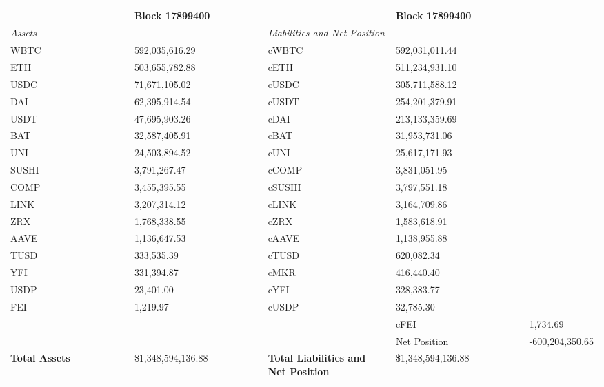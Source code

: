 
\begin{longtable}{@{}p{0.25\linewidth}p{0.25\linewidth}p{0.25\linewidth}p{0.25\linewidth}@{}}

\toprule


& Block 17899400 & & Block 17899400 \\

\midrule
\textit{Assets} & & \textit{Liabilities and Net Position} \\
WBTC & 592,035,616.29 & cWBTC & 592,031,011.44 \\
ETH & 503,655,782.88 & cETH & 511,234,931.10 \\
USDC & 71,671,105.02 & cUSDC & 305,711,588.12 \\
DAI & 62,395,914.54 & cUSDT & 254,201,379.91 \\
USDT & 47,695,903.26 & cDAI & 213,133,359.69 \\
BAT & 32,587,405.91 & cBAT & 31,953,731.06 \\
UNI & 24,503,894.52 & cUNI & 25,617,171.93 \\
SUSHI & 3,791,267.47 & cCOMP & 3,831,051.95 \\
COMP & 3,455,395.55 & cSUSHI & 3,797,551.18 \\
LINK & 3,207,314.12 & cLINK & 3,164,709.86 \\
ZRX & 1,768,338.55 & cZRX & 1,583,618.91 \\
AAVE & 1,136,647.53 & cAAVE & 1,138,955.88 \\
TUSD & 333,535.39 & cTUSD & 620,082.34 \\
YFI & 331,394.87 & cMKR & 416,440.40 \\
USDP & 23,401.00 & cYFI & 328,383.77 \\
FEI & 1,219.97 & cUSDP & 32,785.30 \\
 & &  & cFEI & 1,734.69 \\
 & &  & Net Position & -600,204,350.65 \\

\midrule

\textbf{Total Assets} & \$1,348,594,136.88 & \textbf{Total Liabilities and Net Position} & \$1,348,594,136.88 \\

\bottomrule

\end{longtable}
